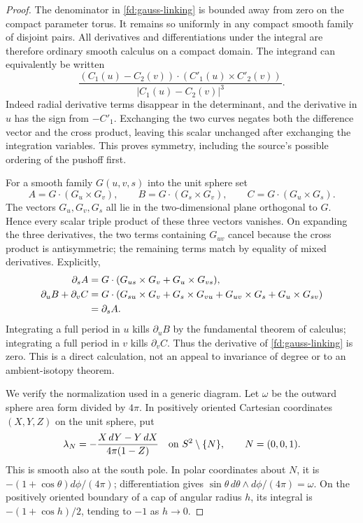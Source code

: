 \begin{proof}
The denominator in \eqref{fd:gauss-linking} is bounded away from zero
on the compact parameter torus. It remains so uniformly in any compact
smooth family of disjoint pairs. All derivatives and differentiations
under the integral are therefore ordinary smooth calculus on a compact
domain. The integrand can equivalently be written
\begin{equation}\label{fd:gauss-integrand}
 \frac{(C_1(u)-C_2(v))\cdot(C'_1(u)\times C'_2(v))}
 {|C_1(u)-C_2(v)|^3}.
\end{equation}
Indeed radial derivative terms disappear in the determinant, and the
derivative in $u$ has the sign from $-C'_1$. Exchanging the two curves
negates both the difference vector and the cross product, leaving this
scalar unchanged after exchanging the integration variables. This proves
symmetry, including the source's possible ordering of the pushoff first.

For a smooth family $G(u,v,s)$ into the unit sphere set
\begin{equation}
 A=G\cdot(G_u\times G_v),\qquad
 B=G\cdot(G_s\times G_v),\qquad
 C=G\cdot(G_u\times G_s).
\end{equation}
The vectors $G_u,G_v,G_s$ all lie in the two-dimensional plane
orthogonal to $G$. Hence every scalar triple product of these three
vectors vanishes. On expanding the three derivatives, the two terms
containing $G_{uv}$ cancel because the cross product is antisymmetric;
the remaining terms match by equality of mixed derivatives. Explicitly,
\begin{align}
 \partial_s A
 &=G\cdot(G_{us}\times G_v+G_u\times G_{vs}),\notag\\
 \partial_u B+\partial_v C
 &=G\cdot(G_{su}\times G_v+G_s\times G_{vu}
                   +G_{uv}\times G_s+G_u\times G_{sv})\notag\\
 &=\partial_s A.
 \label{fd:gauss-divergence}
\end{align}
Integrating a full period in $u$ kills $\partial_u B$ by the
fundamental theorem of calculus; integrating a full period in $v$
kills $\partial_v C$. Thus the derivative of
\eqref{fd:gauss-linking} is zero. This is a direct calculation, not
an appeal to invariance of degree or to an ambient-isotopy theorem.

We verify the normalization used in a generic diagram. Let $\omega$
be the outward sphere area form divided by $4\pi$. In positively
oriented Cartesian coordinates $(X,Y,Z)$ on the unit sphere, put
\begin{equation}\label{fd:sphere-primitive}
 \lambda_N=-\frac{X\,dY-Y\,dX}{4\pi(1-Z)}
          \quad\hbox{on }S^2\setminus\{N\},\qquad N=(0,0,1).
\end{equation}
This is smooth also at the south pole. In polar coordinates about
$N$, it is $-(1+\cos\theta)d\phi/(4\pi)$; differentiation
gives $\sin\theta\,d\theta\wedge d\phi/(4\pi)=\omega$.
On the positively oriented boundary of a cap of angular radius $h$,
its integral is $-(1+\cos h)/2$, tending to $-1$ as $h\to0$.


\end{proof}
